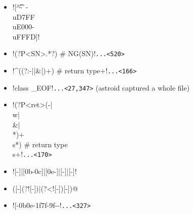 \begin{itemize}[noitemsep,topsep=0pt]
\item \cverb![^\t\n\r -~-\\uD7FF\\uE000-\\uFFFD]!
\item \cverb!\n    (?P<SN>.*?)         # NG(SN)!\verb!...<520>!
\item \cverb!^\n\s*((?:-|\w|\&|\*)+)  # return type\n\s+!\verb!...<166>!
\item \cverb!class _EOF!\verb!...<27,347>! (astroid captured a whole file)
\item \cverb!\n(?P<ret>(-|\\w|\\&|\\*)+\\s*)  # return type\n\\s+!\verb!...<170>!
\item \cverb![-]|[\x0b-\x0c]|[\x0e-]|[-\udfff]|[\ufffe-\uffff]!
\item \cverb@([-\udbff](?![-\udfff])|(?<![-\udbff])[-\udfff])@
\item \cverb![-\x0b\x0e-\x1f\x7f-\x9f-\udfff{}-\ufdef\ufffe!\verb!...<327>!
\end{itemize}

